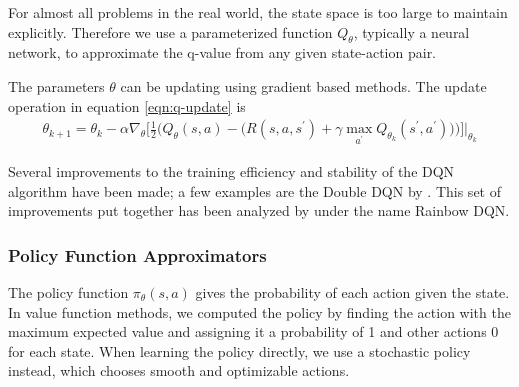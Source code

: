 For almost all problems in the real world, the state space is too large to maintain explicitly. Therefore we use a parameterized function $Q_{\theta}$, typically a neural network, to approximate the q-value from any given state-action pair.

The parameters $\theta$ can be updating using gradient based methods. The update operation in equation \ref{eqn:q-update} is 
\begin{equation}
    \label{eqn:q-update}
    \begin{split}
        \theta_{k+1} = \theta_k - \alpha \nabla_\theta \Bigg[\frac{1}{2} \bigg(Q_\theta(s, a) - \Big(R(s, a, s^\prime) + \gamma \max_{a^\prime} Q_{\theta_k}(s^\prime, a^\prime)  \Big) \bigg) \Bigg] \Bigg\vert_{\theta_k}
    \end{split}
\end{equation}

Several improvements to the training efficiency and stability of the DQN algorithm have been made; a few examples are the Double DQN by \cite{double-dqn}. This set of improvements put together has been analyzed by \cite{rainbow-dqn} under the name Rainbow DQN.

\subsubsection{Policy Function Approximators}

The policy function $\pi_\theta(s, a)$ gives the probability of each action given the state. In value function methods, we computed the policy by finding the action with the maximum expected value and assigning it a probability of 1 and other actions 0 for each state. When learning the policy directly, we use a stochastic policy instead, which chooses smooth and optimizable actions.


